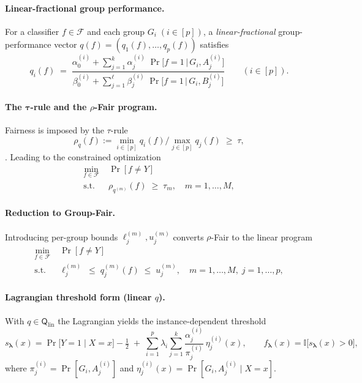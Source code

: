 \documentclass[12pt,a4paper,openright,twoside]{book}
\begin{document}
\paragraph{Linear-fractional group performance.}
For a classifier $f\!\in\!\mathcal{F}$ and each group $G_i\;(i\!\in\![p])$, a \emph{linear-fractional} group-performance vector $q(f)=(q_1(f),\dots,q_p(f))$ satisfies \cite{celis2020classificationfairnessconstraintsmetaalgorithm}
\[
q_i(f)\;=\;
\frac{\displaystyle 
\alpha^{(i)}_0+\sum_{j=1}^{k}\alpha^{(i)}_j\;
      \Pr\!\bigl[f=1\,\bigl\vert\,G_i,A^{(i)}_{j}\bigr]}
     {\displaystyle
      \beta^{(i)}_0+\sum_{j=1}^{\ell}\beta^{(i)}_j\;
      \Pr\!\bigl[f=1\,\bigl\vert\,G_i,B^{(i)}_{j}\bigr]}
\qquad(i\in[p]).
\]

\paragraph{The $\boldsymbol{\tau}$-rule and the \texorpdfstring{$\rho$}{rho}-Fair program.}
Fairness is imposed by the $\tau$-rule
\[
\rho_q(f):=\min_{i\in[p]}q_i(f)/\max_{j\in[p]}q_j(f)\;\ge\;\tau,
\] \cite{celis2020classificationfairnessconstraintsmetaalgorithm}.
Leading to the constrained optimization
\[
\begin{aligned}
\min_{f\in\mathcal{F}}\;&\Pr[f\neq Y]\\
\text{s.t.}\;&\rho_{q^{(m)}}(f)\;\ge\;\tau_m,\quad m=1,\dots,M,
\end{aligned}
\tag{$\rho$-Fair} %
\]

\paragraph{Reduction to Group-Fair.}
Introducing per-group bounds $\ell_j^{(m)},u_j^{(m)}$ converts $\rho$-Fair to the linear program \cite{celis2020classificationfairnessconstraintsmetaalgorithm}
\[
\begin{aligned}
\min_{f\in\mathcal{F}}\;&\Pr[f\neq Y]\\
\text{s.t.}\;&\ell^{(m)}_j\;\le\;q^{(m)}_j(f)\;\le\;u^{(m)}_j,
\quad m=1,\dots,M,\;j=1,\dots,p,
\end{aligned}
\tag{Group-Fair}
\]

\paragraph{Lagrangian threshold form (linear $q$).}
With $q\in\mathsf{Q}_{\text{lin}}$ the Lagrangian yields the instance-dependent threshold \cite{celis2020classificationfairnessconstraintsmetaalgorithm}
\[
s_{\boldsymbol\lambda}(x)=
\Pr\!\bigl[Y=1\mid X=x\bigr]-\tfrac12
\;+\;
\sum_{i=1}^{p}\lambda_i
  \sum_{j=1}^{k}
      \frac{\alpha^{(i)}_j}{\pi^{(i)}_j}\,
      \eta^{(i)}_j(x),
\qquad
f_{\boldsymbol\lambda}(x)=\mathbb{I}\bigl[s_{\boldsymbol\lambda}(x)>0\bigr],
\]
where $\pi^{(i)}_j=\Pr[G_i,A^{(i)}_j]$ and $\eta^{(i)}_j(x)=\Pr[G_i,A^{(i)}_j\mid X=x]$.
\end{document}
